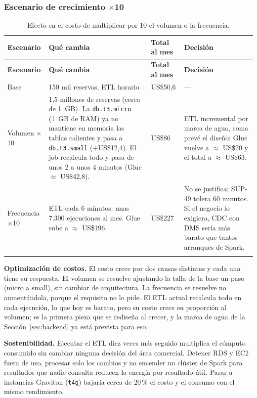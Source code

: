 \documentclass[10pt,letterpaper]{article}
\begin{document}
\subsubsection{Escenario de crecimiento $\times$10}
\begin{longtable}{@{}L{3.2cm} L{6.4cm} R{2.6cm} L{3.4cm}@{}}
\toprule \textbf{Escenario} & \textbf{Qué cambia} & \textbf{Total al mes} & \textbf{Decisión} \\ \midrule \endfirsthead
\toprule \textbf{Escenario} & \textbf{Qué cambia} & \textbf{Total al mes} & \textbf{Decisión} \\ \midrule \endhead
Base & 150 mil reservas, ETL horario & US\$50,6 & --- \\
Volumen $\times$10 & 1,5 millones de reservas (cerca de 1~GB). La \texttt{db.t3.micro} (1~GB de RAM) ya no mantiene en memoria las tablas calientes y pasa a \texttt{db.t3.small} (+US\$12,4). El job recalcula todo y pasa de unos 2 a unos 4 minutos (Glue $\approx$ US\$42,8). & US\$86 & ETL incremental por marca de agua, como prevé el diseño: Glue vuelve a $\approx$ US\$20 y el total a $\approx$ US\$63. \\
Frecuencia $\times$10 & ETL cada 6 minutos: unas 7.300 ejecuciones al mes. Glue sube a $\approx$ US\$196. & US\$227 & No se justifica: SUP-49 tolera 60 minutos. Si el negocio lo exigiera, CDC con DMS sería más barato que tantos arranques de Spark. \\
\bottomrule
\caption{Efecto en el costo de multiplicar por 10 el volumen o la frecuencia.}
\end{longtable}

\textbf{Optimización de costos.} El costo crece por dos causas distintas y cada una tiene su respuesta. El volumen se resuelve ajustando la talla de la base un paso (micro a small), sin cambiar de arquitectura. La frecuencia se resuelve no aumentándola, porque el requisito no lo pide. El ETL actual recalcula todo en cada ejecución, lo que hoy es barato, pero su costo crece en proporción al volumen; es la primera pieza que se rediseña al crecer, y la marca de agua de la Sección~\ref{sec:backend} ya está prevista para eso.

\textbf{Sostenibilidad.} Ejecutar el ETL diez veces más seguido multiplica el cómputo consumido sin cambiar ninguna decisión del área comercial. Detener RDS y EC2 fuera de uso, procesar solo los cambios y no encender un clúster de Spark para resultados que nadie consulta reducen la energía por resultado útil. Pasar a instancias Graviton (\texttt{t4g}) bajaría cerca de 20\,\% el costo y el consumo con el mismo rendimiento.
\end{document}
